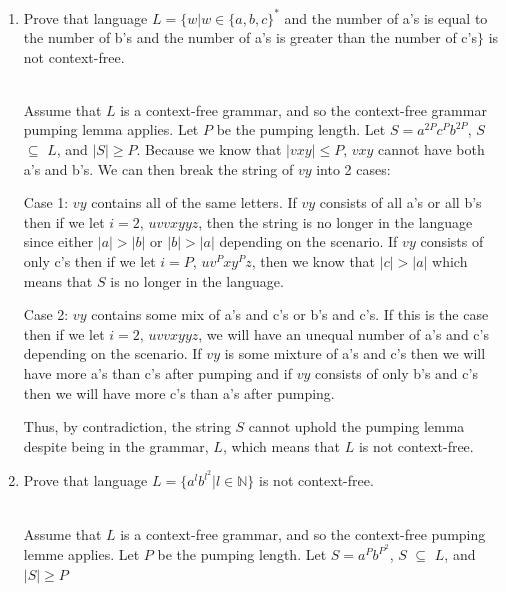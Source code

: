 \documentclass[11pt]{article}
\theoremstyle{definition}
\theoremstyle{theorem}
\newcommand{\solution}{\medskip\noindent{\color{blue}\textbf{Solution:}}}
\begin{document}
\begin{enumerate}[label=(\alph*)]
\begin{enumerate}[label=(\alph*)]
\item Prove that language $L = \{w | w \in \{a,b,c\}^*$ and the number of a's is equal to the number of b's and the number of a's is greater than the number of c's$\}$ is not context-free.

\solution \\
Assume that $L$ is a context-free grammar, and so the context-free grammar pumping lemma applies. Let $P$ be the pumping length. Let $S = a^{2P}c^{P}b^{2P}$,  $S$ $\subseteq$ $L$, and $|S| \geq P$. Because we know that $|vxy| \leq P$, $vxy$ cannot have both a's and b's. We can then break the string of $vy$ into 2 cases:

Case 1: $vy$ contains all of the same letters. If $vy$ consists of all a's or all b's then if we let $i = 2$, $uvvxyyz$, then the string is no longer in the language since either $|a| > |b|$ or $|b| > |a|$ depending on the scenario. If $vy$ consists of only c's then if we let $i = P$, $uv^Pxy^Pz$, then we know that $|c| > |a|$ which means that $S$ is no longer in the language. 

Case 2: $vy$ contains some mix of a's and c's or b's and c's. If this is the case then if we let $i = 2$, $uvvxyyz$, we will have an unequal number of a's and c's depending on the scenario. If $vy$ is some mixture of a's and c's then we will have more a's than c's after pumping and if $vy$ consists of only b's and c's then we will have more c's than a's after pumping.

Thus, by contradiction, the string $S$ cannot uphold the pumping lemma despite being in the grammar, $L$, which means that $L$ is not context-free.
\item Prove that language $L = \{a^l b^{l^2} | l \in \mathbb{N}\}$ is not context-free.

\solution \\
Assume that $L$ is a context-free grammar, and so the context-free pumping lemme applies. Let $P$ be the pumping length. Let $S = a^Pb^{P^2}$, $S$ $\subseteq$ $L$, and $|S| \geq P$



\end{enumerate}



\end{enumerate}
\end{document}
